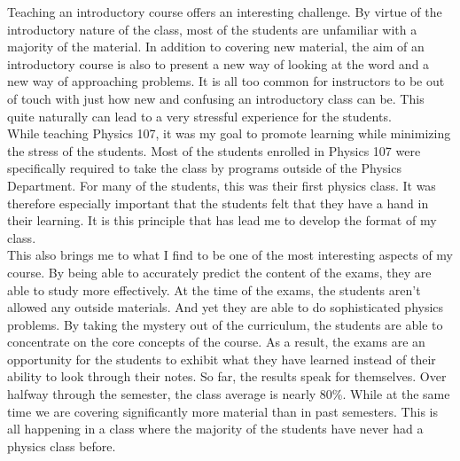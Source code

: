  {%
Teaching an introductory course offers an interesting challenge.  By virtue of the introductory nature of the class, most of the students are unfamiliar with a majority of the material.  In addition to covering new material, the aim of an introductory course is also to present a new way of looking at the word and a new way of approaching problems.  It is all too common for instructors to be out of touch with just how new and confusing an introductory class can be.  This quite naturally can lead to a very stressful experience for the students.\\

While teaching Physics 107, it was my goal to promote learning while minimizing the stress of the students.  Most of the students enrolled in Physics 107 were specifically required to take the class by programs outside of the Physics Department.  For many of the students, this was their first physics class.  It was therefore especially important that the students felt that they have a hand in their learning.  It is this principle that has lead me to develop the format of my class.\\

This also brings me to what I find to be one of the most interesting aspects of my course.  By being able to accurately predict the content of the exams, they are able to study more effectively.
At the time of the exams, the students aren't allowed any outside materials.  And yet they are able to do sophisticated physics problems.  By taking the mystery out of the curriculum, the students are able to concentrate on the core concepts of the course.  As a result, the exams are an opportunity for the students to exhibit what they have learned instead of their ability to look through their notes.
So far, the results speak for themselves.  Over halfway through the semester, the class average is nearly 80\%.  While at the same time we are covering significantly more material than in past semesters.  This is all happening in a class where the majority of the students have never had a physics class before.
}
